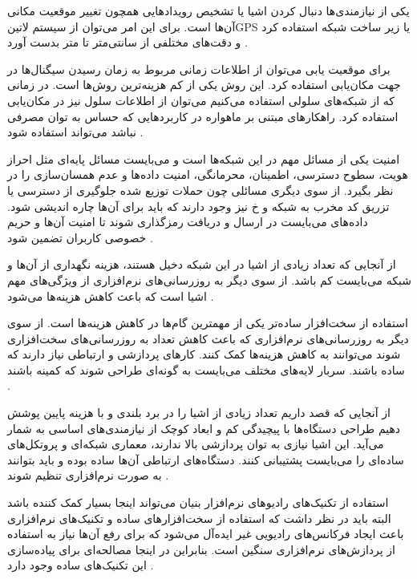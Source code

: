 
یکی از نیازمندی‌ها دنبال کردن اشیا یا تشخیص رویدادهایی همچون تغییر موقعیت مکانی آن‌ها است.
برای این امر می‌توان از سیستم ‌لاتین{GPS} یا زیر ساخت شبکه استفاده کرد و دقت‌های مختلفی
از سانتی‌متر تا متر بدست آورد
.

برای موقعیت یابی می‌توان از اطلاعات زمانی مربوط به زمان رسیدن سیگنال‌ها در جهت مکان‌یابی استفاده کرد. این روش
یکی از کم هزینه‌ترین روش‌ها است. در زمانی که از شبکه‌های سلولی استفاده می‌کنیم می‌توان از اطلاعات سلول نیز
در مکان‌یابی استفاده کرد. راهکارهای مبتنی بر ماهواره در کاربردهایی که حساس به توان مصرفی نباشد می‌تواند استفاده شود
.


امنیت یکی از مسائل مهم در این شبکه‌ها است و می‌بایست مسائل پایه‌ای
مثل احراز هویت، سطوح دسترسی، اطمینان، محرمانگی، امنیت داده‌ها و عدم همسان‌سازی را در نظر بگیرد.
از سوی دیگری مسائلی چون حملات توزیع شده جلوگیری از دسترسی یا تزریق کد مخرب به شبکه و ‌خ
نیز وجود دارند که باید برای آن‌ها چاره اندیشی شود.
داده‌های می‌بایست در ارسال و دریافت رمزگذاری شوند تا امنیت آن‌ها و حریم خصوصی کاربران تضمین شود
.


از آنجایی که تعداد زیادی از اشیا در این شبکه دخیل هستند، هزینه نگهداری از آن‌ها و شبکه می‌بایست کم باشد.
از سوی دیگر به روزرسانی‌های نرم‌افزاری از ویژگی‌های مهم اشیا است که باعث کاهش هزینه‌ها می‌شود
.

استفاده از سخت‌افزار ساده‌تر یکی از مهمترین گام‌ها در کاهش هزینه‌ها است. از سوی دیگر به روزرسانی‌های
نرم‌افزاری که باعث کاهش تعداد به روزرسانی‌های سخت‌افزاری شوند می‌توانند به کاهش هزینه‌ها کمک کنند.
کارهای پردازشی و ارتباطی نیاز دارند که ساده باشند. سربار لایه‌های مختلف می‌بایست به گونه‌ای طراحی شوند
که کمینه باشند
.


از آنجایی که قصد داریم تعداد زیادی از اشیا را در برد بلندی و با هزینه پایین پوشش دهیم طراحی دستگاه‌ها با پیچیدگی کم
و ابعاد کوچک از نیازمندی‌های اساسی به شمار می‌آید. این اشیا نیازی به توان پردازشی بالا ندارند، معماری شبکه‌ای و پروتکل‌های
ساده‌ای را می‌بایست پشتیبانی کنند. دستگاه‌های ارتباطی آن‌ها ساده بوده و باید بتوانند به صورت نرم‌افزاری تنظیم شوند
.

استفاده از تکنیک‌های رادیوهای نرم‌افزار بنیان می‌تواند اینجا بسیار کمک کننده باشد
البته باید در نظر داشت که استفاده از سخت‌افزارهای ساده و تکنیک‌های نرم‌افزاری
باعث ایجاد فرکانس‌های رادیویی غیر ایده‌آل می‌شود که برای رفع آن‌ها نیاز به استفاده
از پردازش‌های نرم‌افزاری سنگین است. بنابراین در اینجا مصالحه‌ای برای پیاده‌سازی
این تکنیک‌های ساده وجود دارد
.

